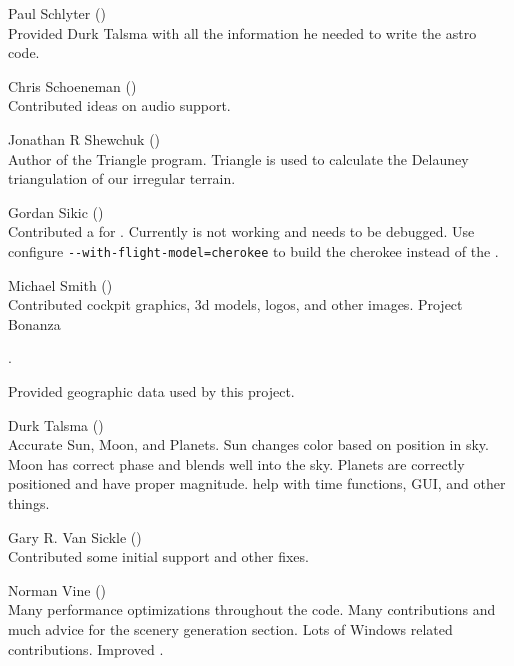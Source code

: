 \noindent Paul Schlyter ()\\
  Provided Durk Talsma with all the information he needed to write the astro code.
 \medskip

\noindent Chris Schoeneman ()\\
  Contributed ideas on audio support.
 \medskip

\noindent Jonathan R Shewchuk
()\\
  Author of the Triangle program.  Triangle
  is used to calculate the  Delauney triangulation of our irregular terrain.
 \medskip

\noindent Gordan Sikic ()\\
  Contributed a  for .  Currently is not
  working and needs to be debugged.  Use configure
  \texttt{-$\!$-with-flight-model=cherokee}
  to build the cherokee instead of the .
 \medskip

\noindent Michael Smith ()\\
  Contributed cockpit graphics, 3d models, logos, and other images.
  Project Bonanza

  .
 \medskip

\noindent


 \noindent
  Provided geographic data used by this project.
 \medskip

\noindent Durk Talsma ()\\
  Accurate Sun, Moon, and Planets.  Sun changes color based on
  position in sky. Moon has correct phase and blends well into the
  sky.  Planets are correctly positioned and have proper magnitude. help with time
  functions, GUI, and other things.
 \medskip

\noindent Gary R. Van Sickle
()\\
  Contributed some initial  support and other fixes.
 \medskip

\noindent Norman Vine ()\\
  Many performance optimizations throughout the code.  Many contributions
  and much advice for the scenery generation section.  Lots of Windows
  related contributions. Improved .
\medskip

